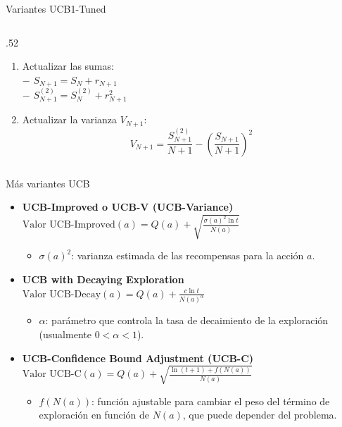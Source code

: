 \documentclass[10pt, envcountsect, handout, aspectratio=1610, hyperref={hypertexnames=true}]{beamer}
\begin{document}
\begin{frame}{Variantes UCB1-Tuned}
\begin{itemize}
\begin{itemize}
\begin{columns}
\begin{column}{.52\textwidth}
\begin{enumerate}
		\item Actualizar las sumas: \\
			$-$ \(S_{N+1} = S_N + r_{N+1}\) \\
			$-$  \( S_{N+1}^{(2)} = S_N^{(2)} + r_{N+1}^2\)

		\item Actualizar la varianza \( V_{N+1} \):
   			\[
   			V_{N+1} = \frac{S_{N+1}^{(2)}}{N+1} - \left( \frac{S_{N+1}}{N+1} \right)^2
  			 \]
		\end{enumerate}
	\end{column}
	\end{columns}	
    \end{itemize}
\end{itemize}

\end{frame}



\begin{frame}{Más variantes UCB}
\begin{itemize}


\item \textbf{UCB-Improved o UCB-V (UCB-Variance)} $\text{Valor UCB-Improved}(a) = Q(a) + \sqrt{\frac{\sigma(a)^2 \ln t}{N(a)}}$
    \begin{itemize}
        \item \( \sigma(a)^2 \): varianza estimada de las recompensas para la acción \( a \).
    \end{itemize}
    
\item \textbf{UCB with Decaying Exploration} $\text{Valor UCB-Decay}(a) = Q(a) + \frac{c \ln t}{N(a)^{\alpha}}$
    \begin{itemize}
        \item \( \alpha \): parámetro que controla la tasa de decaimiento de la exploración (usualmente \( 0 < \alpha < 1 \)).
    \end{itemize}
    
\item \textbf{UCB-Confidence Bound Adjustment (UCB-C)} $\text{Valor UCB-C}(a) = Q(a) + \sqrt{\frac{\ln(t + 1) + f(N(a))}{N(a)}}$
    \begin{itemize}
        \item \( f(N(a)) \): función ajustable para cambiar el peso del término de exploración en función de \( N(a) \), que puede depender del problema.
    \end{itemize}
\end{itemize}

\end{frame}
\end{document}
